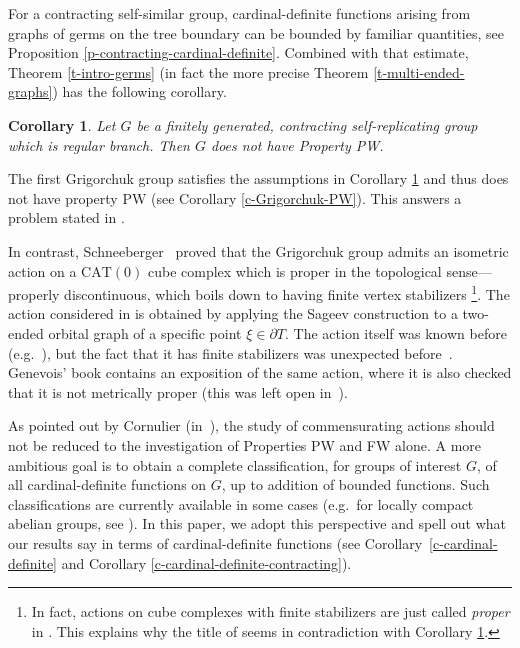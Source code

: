 \documentclass[11pt]{amsart}
\theoremstyle{definition}
\theoremstyle{plain}
\newtheorem{main thm}{Theorem}
\theoremstyle{remark}
\theoremstyle{plain}
\newtheorem{introcor}[introthm]{Corollary}
\begin{document}
For a contracting self-similar group, cardinal-definite functions arising from graphs of germs on the tree boundary can be bounded by familiar quantities, see Proposition \ref{p-contracting-cardinal-definite}. Combined with that estimate,  Theorem \ref{t-intro-germs} (in fact the more precise Theorem \ref{t-multi-ended-graphs}) has the following corollary.  
\begin{introcor}\label{c-intro-not-PW}
Let $G$ be a finitely generated, contracting self-replicating group which is regular branch. Then $G$ does not have Property PW.
\end{introcor}
The first Grigorchuk group satisfies the assumptions in Corollary \ref{c-intro-not-PW} and thus does not have property PW (see Corollary \ref{c-Grigorchuk-PW}). This answers a problem stated in \cite[\S2.B]{Cor-FWsurvey}.

In contrast, Schneeberger~\cite{Schneeberger} proved that the Grigorchuk group admits an isometric action on a $\mathrm{CAT}(0)$ cube complex which is proper in the topological sense---properly discontinuous, which boils down to having finite vertex stabilizers \footnote{In fact, actions on cube complexes with finite stabilizers are just called \emph{proper} in \cite{Schneeberger}. This explains why the title of \cite{Schneeberger} seems in contradiction with Corollary \ref{c-intro-not-PW}.}. The action considered in \cite{Schneeberger} is obtained by applying the Sageev construction to a two-ended orbital graph of a specific point $\xi\in \partial T$. The action itself was known before (e.g.\ \cite[\S2.B]{Cor-FWsurvey}), but the fact that it has finite stabilizers was unexpected before~\cite{Schneeberger}.  Genevois' book \cite[\S14]{Genevois-book} contains an exposition of the same action, where it is also  checked that it is not metrically proper (this was left open in~\cite{Schneeberger}).

As pointed out by Cornulier (in~\cite[\S2.E]{Cor-FWsurvey}), the study of commensurating actions should not be reduced to the investigation of Properties PW and FW alone. A more ambitious goal is to obtain a complete classification, for groups of interest $G$, of all cardinal-definite functions on $G$, up to addition of bounded functions. 
Such classifications are currently available in some cases (e.g.\ for locally compact abelian groups, see \cite{Cor-FWsurvey}). In this paper, we adopt this perspective and spell out what our results say in terms of cardinal-definite functions (see Corollary~\ref{c-cardinal-definite} and Corollary \ref{c-cardinal-definite-contracting}).
\end{document}

